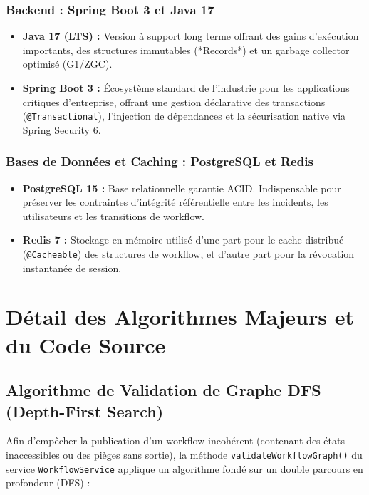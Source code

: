 \documentclass[12pt,a4paper]{article}
\begin{document}
\subsubsection{Backend : Spring Boot 3 et Java 17}
\begin{itemize}
    \item \textbf{Java 17 (LTS) :} Version à support long terme offrant des gains d'exécution importants, des structures immutables (*Records*) et un garbage collector optimisé (G1/ZGC).
    \item \textbf{Spring Boot 3 :} Écosystème standard de l'industrie pour les applications critiques d'entreprise, offrant une gestion déclarative des transactions (\texttt{@Transactional}), l'injection de dépendances et la sécurisation native via Spring Security 6.
\end{itemize}

\subsubsection{Bases de Données et Caching : PostgreSQL et Redis}
\begin{itemize}
    \item \textbf{PostgreSQL 15 :} Base relationnelle garantie ACID. Indispensable pour préserver les contraintes d'intégrité référentielle entre les incidents, les utilisateurs et les transitions de workflow.
    \item \textbf{Redis 7 :} Stockage en mémoire utilisé d'une part pour le cache distribué (\texttt{@Cacheable}) des structures de workflow, et d'autre part pour la révocation instantanée de session.
\end{itemize}

\clearpage

\section{Détail des Algorithmes Majeurs et du Code Source}

\subsection{Algorithme de Validation de Graphe DFS (Depth-First Search)}
Afin d'empêcher la publication d'un workflow incohérent (contenant des états inaccessibles ou des pièges sans sortie), la méthode \texttt{validateWorkflowGraph()} du service \texttt{WorkflowService} applique un algorithme fondé sur un double parcours en profondeur (DFS) :
\end{document}
